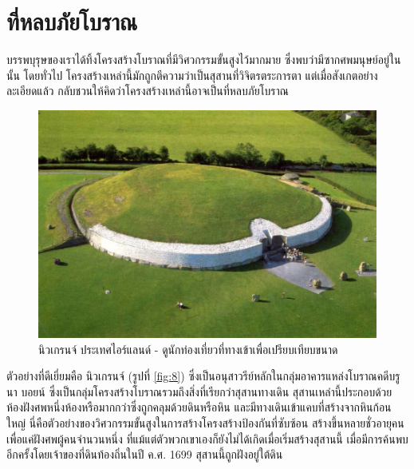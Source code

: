 \documentclass[10pt,twocolumn,letterpaper]{article}
\begin{document}
\section{ที่หลบภัยโบราณ}

บรรพบุรุษของเราได้ทิ้งโครงสร้างโบราณที่มีวิศวกรรมขั้นสูงไว้มากมาย ซึ่งพบว่ามีซากศพมนุษย์อยู่ในนั้น โดยทั่วไป โครงสร้างเหล่านี้มักถูกตีความว่าเป็นสุสานที่วิจิตรตระการตา แต่เมื่อสังเกตอย่างละเอียดแล้ว กลับชวนให้คิดว่าโครงสร้างเหล่านี้อาจเป็นที่หลบภัยโบราณ

\begin{figure}[b]
\begin{center}
   \includegraphics[width=1\linewidth]{ww19.jpg}
\end{center}
   \caption{นิวเกรนจ์ ประเทศไอร์แลนด์ - ดูนักท่องเที่ยวที่ทางเข้าเพื่อเปรียบเทียบขนาด}
\label{fig:8}
\label{fig:onecol}
\end{figure}

ตัวอย่างที่ดีเยี่ยมคือ นิวเกรนจ์ (รูปที่ \ref{fig:8}) ซึ่งเป็นอนุสาวรีย์หลักในกลุ่มอาคารแหล่งโบราณคดีบรู นา บอยน์  ซึ่งเป็นกลุ่มโครงสร้างโบราณรวมถึงสิ่งที่เรียกว่าสุสานทางเดิน สุสานเหล่านี้ประกอบด้วยห้องฝังศพหนึ่งห้องหรือมากกว่าซึ่งถูกคลุมด้วยดินหรือหิน และมีทางเดินเข้าแคบที่สร้างจากหินก้อนใหญ่ \cite{70} นี่คือตัวอย่างของวิศวกรรมขั้นสูงในการสร้างโครงสร้างป้องกันที่ซับซ้อน สร้างขึ้นหลายชั่วอายุคน เพื่อแค่ฝังศพผู้คนจำนวนหนึ่ง ที่แม้แต่ตัวพวกเขาเองก็ยังไม่ได้เกิดเมื่อเริ่มสร้างสุสานนี้ เมื่อมีการค้นพบอีกครั้งโดยเจ้าของที่ดินท้องถิ่นในปี ค.ศ. 1699 สุสานนี้ถูกฝังอยู่ใต้ดิน
\end{document}
